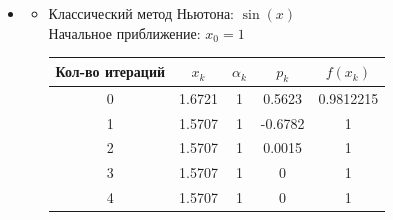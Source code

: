 \documentclass[a4paper, 14pt]{article}
\begin{document}
\begin{itemize}
\item 
	\begin{itemize}
		\item Классический метод Ньютона: $\sin(x)$\\
		Начальное приближение: $x_0 = 1$\\
		\begin{tabular}{  |c | c | c| c| c|}
\hline
Кол-во итераций & $x_k$ & $\alpha_k$ & $p_k$  & $f(x_k)$\\ \hline
0 & 1.6721 & 1 & 0.5623 & 0.9812215 \\
1 & 1.5707  & 1& -0.6782 & 1\\
2 & 1.5707 & 1 & 0.0015 & 1 \\
3 & 1.5707 & 1 & 0 & 1 \\
4 & 1.5707 & 1 & 0 & 1 \\
\hline
\end{tabular}


\end{itemize}
\end{itemize}
\end{document}
